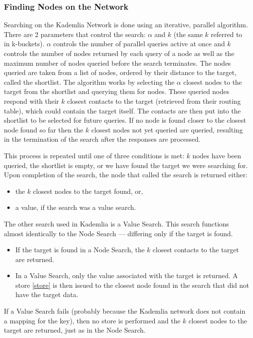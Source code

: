 \documentclass[12pt]{report}
\begin{document}
            \subsubsection{Finding Nodes on the Network\label{find_nodes}}
            Searching on the Kademlia Network is done using an iterative,
            parallel algorithm. There are 2 parameters that control the search:
            $\alpha$ and $k$ (the same $k$ referred to in k-buckets). $\alpha$
            controls the number of parallel queries active at once and $k$
            controls the number of nodes returned by each query of a node as
            well as the maximum number of nodes queried before the search
            terminates. The nodes queried are taken from a list of nodes,
            ordered by their distance to the target, called the shortlist. The
            algorithm works by selecting the $\alpha$ closest nodes to the
            target from the shortlist and querying them for nodes. These
            queried nodes respond with their $k$ closest contacts to the target
            (retrieved from their routing table), which could contain the
            target itself. The contacts are then put into the shortlist to be
            selected for future queries. If no node is found closer to the
            closest node found so far then the $k$ closest nodes not yet queried
            are queried, resulting in the termination of the search after the
            responses are processed.
		
		This process is repeated until one of three conditions is met: $k$ nodes
		have been queried, the shortlist is empty, or we have found the target 
		we were searching for. Upon completion of the search, the node that 
		called the search is returned either:
        \begin{itemize}
            \item the $k$ closest nodes to the target found, or,
            \item a value, if the search was a value search.
        \end{itemize}
		
        The other search used in Kademlia is a Value Search. This search
        functions almost identically to the Node Search --- differing only if
        the target is found. 
        \begin{itemize}
            \item If the target is found in a Node Search, the $k$ closest
                contacts to the target are returned. 
            \item In a Value Search, only the value associated with the target
                is returned. A store \ref{store} is then issued to the closest
                node found in the search that did not have the target data. 
        \end{itemize}
        If a Value Search fails (probably because the Kademlia network does not
        contain a mapping for the key), then no store is performed and the $k$
        closest nodes to the target are returned, just as in the Node Search.
\end{document}
